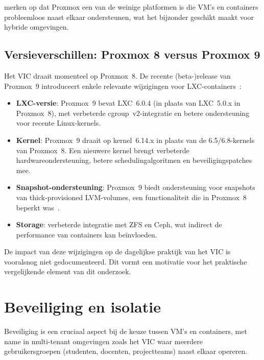 \textcite{ReadySpace2023} merken op dat Proxmox een van de weinige platformen is die VM's en containers probleemloos naast elkaar ondersteunen, wat het bijzonder geschikt maakt voor hybride omgevingen.

\subsection{Versieverschillen: Proxmox 8 versus Proxmox 9}
\label{subsec:proxmox-versies}

Het VIC draait momenteel op Proxmox~8. De recente (beta-)release van Proxmox~9 introduceert enkele relevante wijzigingen voor LXC-containers~\autocite{Xtom2025, UnixHost2025, Saturnme2025}:

\begin{itemize}
    \item \textbf{LXC-versie}: Proxmox~9 bevat LXC~6.0.4 (in plaats van LXC~5.0.x in Proxmox~8), met verbeterde cgroup~v2-integratie en betere ondersteuning voor recente Linux-kernels.
    \item \textbf{Kernel}: Proxmox~9 draait op kernel~6.14.x in plaats van de 6.5/6.8-kernels van Proxmox~8. Een nieuwere kernel brengt verbeterde hardwareondersteuning, betere schedulingalgoritmen en beveiligingspatches mee.
    \item \textbf{Snapshot-ondersteuning}: Proxmox~9 biedt ondersteuning voor snapshots van thick-provisioned LVM-volumes, een functionaliteit die in Proxmox~8 beperkt was~\autocite{Proxmox2025}.
    \item \textbf{Storage}: verbeterde integratie met ZFS en Ceph, wat indirect de performance van containers kan beïnvloeden.
\end{itemize}

De impact van deze wijzigingen op de dagelijkse praktijk van het VIC is vooralsnog niet gedocumenteerd. Dit vormt een motivatie voor het praktische vergelijkende element van dit onderzoek.

\section{Beveiliging en isolatie}
\label{sec:beveiliging-isolatie}

Beveiliging is een cruciaal aspect bij de keuze tussen VM's en containers, met name in multi-tenant omgevingen zoals het VIC waar meerdere gebruikersgroepen (studenten, docenten, projectteams) naast elkaar opereren.

